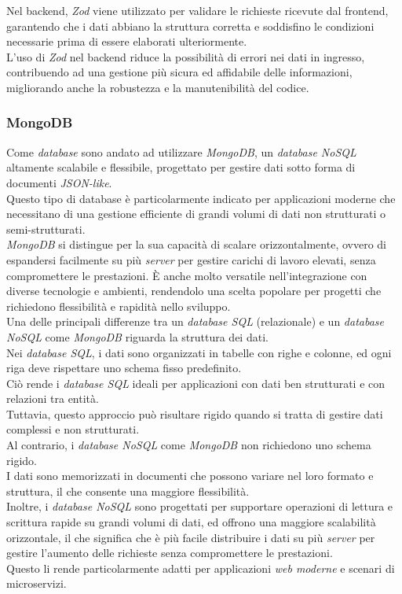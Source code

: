 \noindent Nel \gls{backend}, \textit{Zod} viene utilizzato per validare le richieste ricevute dal \gls{frontend}, garantendo che i dati abbiano la struttura corretta e soddisfino le condizioni necessarie prima di essere elaborati ulteriormente.\\
L'uso di \textit{Zod} nel backend riduce la possibilità di errori nei dati in ingresso, contribuendo ad una gestione più sicura ed affidabile delle informazioni, migliorando anche la robustezza e la manutenibilità del codice.

\subsubsection{MongoDB}

Come \textit{database} sono andato ad utilizzare \textit{MongoDB}, un \textit{database NoSQL} altamente scalabile e flessibile, progettato per gestire dati sotto forma di documenti \textit{JSON-like}.\\
Questo tipo di database è particolarmente indicato per applicazioni moderne che necessitano di una gestione efficiente di grandi volumi di dati non strutturati o semi-strutturati.\\
\textit{MongoDB} si distingue per la sua capacità di scalare orizzontalmente, ovvero di espandersi facilmente su più \textit{server}  per gestire carichi di lavoro elevati, senza compromettere le prestazioni. 
È anche molto versatile nell'integrazione con diverse tecnologie e ambienti, rendendolo una scelta popolare per progetti che richiedono flessibilità e rapidità nello sviluppo.\\

\noindent Una delle principali differenze tra un \textit{database SQL} (relazionale) e un \textit{database NoSQL} come \textit{MongoDB} riguarda la struttura dei dati.\\
Nei \textit{database SQL}, i dati sono organizzati in tabelle con righe e colonne, ed ogni riga deve rispettare uno schema fisso predefinito.\\
Ciò rende i \textit{database SQL} ideali per applicazioni con dati ben strutturati e con relazioni tra entità. \\
Tuttavia, questo approccio può risultare rigido quando si tratta di gestire dati complessi e non strutturati.\\

\noindent Al contrario, i \textit{database NoSQL} come \textit{MongoDB} non richiedono uno schema rigido. \\
I dati sono memorizzati in documenti che possono variare nel loro formato e struttura, il che consente una maggiore flessibilità.\\
Inoltre, i \textit{database NoSQL} sono progettati per supportare operazioni di lettura e scrittura rapide su grandi volumi di dati, ed offrono una maggiore scalabilità orizzontale,
il che significa che è più facile distribuire i dati su più \textit{server} per gestire l'aumento delle richieste senza compromettere le prestazioni.\\
Questo li rende particolarmente adatti per applicazioni \textit{web moderne} e scenari di microservizi.\\

